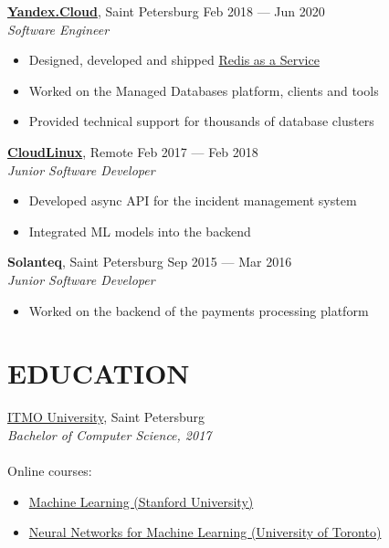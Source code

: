 \documentclass[margin]{cv}
\begin{document}
\begin{resume}
\href{https://cloud.yandex.com}{\bf Yandex.Cloud}, Saint Petersburg \hfill Feb 2018 --- Jun 2020 \\
{\sl Software Engineer}
\begin{itemize}
    \itemsep-2pt
    \itemindent-10pt
    \item Designed, developed and shipped \href{https://cloud.yandex.com/services/managed-redis}{Redis as a Service}
	\item Worked on the Managed Databases platform, clients and tools
	\item Provided technical support for thousands of database clusters
\end{itemize}

\href{https://www.cloudlinux.com}{\bf CloudLinux}, Remote \hfill Feb 2017 --- Feb 2018 \\
{\sl Junior Software Developer}
\begin{itemize}
    \itemsep-2pt
    \itemindent-10pt
	\item Developed async API for the incident management system
	\item Integrated ML models into the backend
\end{itemize}

{\bf Solanteq}, Saint Petersburg \hfill Sep 2015 --- Mar 2016 \\
{\sl Junior Software Developer}
\begin{itemize}
    \itemsep-2pt
    \itemindent-10pt
	\item Worked on the backend of the payments processing platform
\end{itemize}

\section{EDUCATION}
\href{https://en.itmo.ru}{ITMO University}, Saint Petersburg \\
{\sl Bachelor of Computer Science, 2017} \\\\
Online courses:
\begin{itemize}
    \itemsep-2pt
    \itemindent-10pt
    \item \href{https://www.coursera.org/account/accomplishments/verify/NAC3H6WDW9TL}{Machine Learning (Stanford University)}
    \item \href{https://www.coursera.org/account/accomplishments/verify/2LMELT5R6D25}{Neural Networks for Machine Learning (University of Toronto)}
\end{itemize}

\end{resume}
\end{document}
